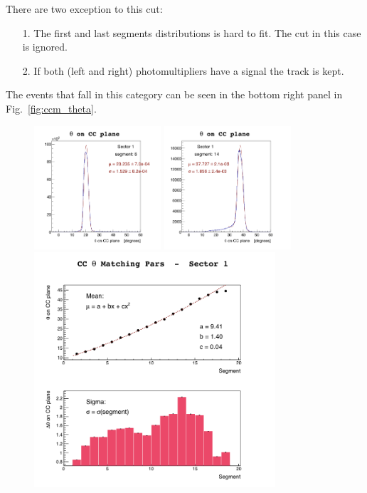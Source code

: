 There are two exception to this cut:
\begin{itemize}
 \item [1.] The first and last segments distributions is hard to fit. The cut in this case is ignored.
 \item [2.] If both (left and right) photomultipliers have a signal the track is kept.
\end{itemize}
The events that fall in this category can be seen in the bottom right panel in Fig.~\ref{fig:ccm_theta}.

\begin{figure}[h]
  \centering
		\includegraphics[width=0.42\textwidth]{img/slice-06_cut-01ccthm_sector-1.png}
		\includegraphics[width=0.42\textwidth]{img/slice-14_cut-01ccthm_sector-1.png}
		\includegraphics[width=0.80\textwidth]{img/cut-01cctmpars_sector-1.png}

\end{figure}
